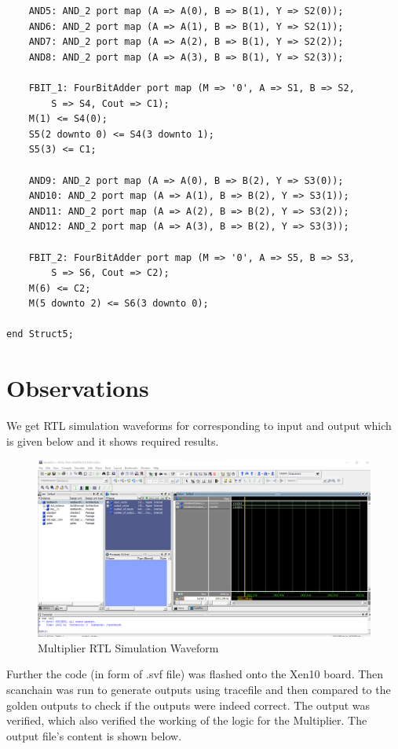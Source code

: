 \documentclass[12pt]{article}
\begin{document}
\begin{verbatim}
	AND5: AND_2 port map (A => A(0), B => B(1), Y => S2(0));
	AND6: AND_2 port map (A => A(1), B => B(1), Y => S2(1));
	AND7: AND_2 port map (A => A(2), B => B(1), Y => S2(2));
	AND8: AND_2 port map (A => A(3), B => B(1), Y => S2(3));
	
	FBIT_1: FourBitAdder port map (M => '0', A => S1, B => S2, 
		S => S4, Cout => C1);
	M(1) <= S4(0); 
	S5(2 downto 0) <= S4(3 downto 1);
	S5(3) <= C1;
	
	AND9: AND_2 port map (A => A(0), B => B(2), Y => S3(0));
	AND10: AND_2 port map (A => A(1), B => B(2), Y => S3(1));
	AND11: AND_2 port map (A => A(2), B => B(2), Y => S3(2));
	AND12: AND_2 port map (A => A(3), B => B(2), Y => S3(3));
	
	FBIT_2: FourBitAdder port map (M => '0', A => S5, B => S3, 
		S => S6, Cout => C2);
	M(6) <= C2;
	M(5 downto 2) <= S6(3 downto 0);
	
end Struct5;
\end{verbatim}

\section{Observations}
 
We get RTL simulation waveforms for corresponding to input and output which is given below and it shows required results.

\begin{figure}[H]
\centering
  \includegraphics[scale=0.35]{Images/Multiplier_RTLSimulation.png}
  \caption{Multiplier RTL Simulation Waveform}
\end{figure}

Further the code (in form of .svf file) was flashed onto the Xen10 board. Then scanchain was run to generate outputs using tracefile and then compared to the golden outputs to check if the outputs were indeed correct. The output was verified, which also verified the working of the logic for the Multiplier. The output file's content is shown below.
\end{document}
